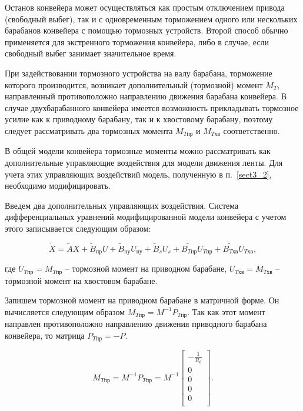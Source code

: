 Останов конвейера может осуществляться как простым отключением привода (свободный выбег), так и с одновременным торможением одного или нескольких барабанов конвейера с помощью тормозных устройств. Второй способ обычно применяется для экстренного торможения конвейера, либо в случае, если свободный выбег занимает значительное время.

При задействовании тормозного устройства на валу барабана, торможение которого производится, возникает дополнительный (тормозной) момент $ M_T $, направленный противоположно направлению движения барабана конвейера. В случае двухбарабанного конвейера имеется возможность прикладывать тормозное усилие как к приводному барабану, так и к хвостовому барабану, поэтому следует рассматривать два тормозных момента $ M_{T \text{пр}} $ и $ M_{T \text{хв}} $ соответственно.

В общей модели конвейера тормозные моменты можно рассматривать как дополнительные управляющие воздействия для модели движения ленты. Для учета этих управляющих воздействий модель, полученную в п.~\ref{sect3_2}, необходимо модифицировать. 

Введем два дополнительных управляющих воздействия. Система дифференциальных уравнений модифицированной модели конвейера с учетом этого записывается следующим образом:

$$ \dot X = \tilde AX + \tilde B_\text{пр}U + \tilde B_\text{ну}U_\text{ну} + \tilde B_s U_s +  \tilde{B_{T \text{пр}}} U_{T \text{пр}} +  \tilde{B_{T \text{хв}}} U_{T \text{хв}}, $$

где $ U_{T \text{пр}} = M_{T \text{пр}}$ -- тормозной момент на приводном барабане,  $ U_{T \text{хв}} = M_{T \text{хв}} $ -- тормозной момент на хвостовом барабане.

Запишем тормозной момент на приводном барабане в матричной форме. Он вычисляется следующим образом $ M_{T \text{пр}} = M^{-1} P_{T \text{пр}} $. Так как этот момент направлен противоположно направлению движения приводного барабана конвейера, то матрица $ P_{T \text{пр}} = -P $.

$$ M_{T \text{пр}} = M^{-1} P_{T \text{пр}} = M^{-1}
	\begin{bmatrix}
	- \frac{1}{R_{\text{б}}} \\
	0                        \\
 	0                        \\
	0                        \\
	0                        \\
	\end{bmatrix}.
 $$
 
